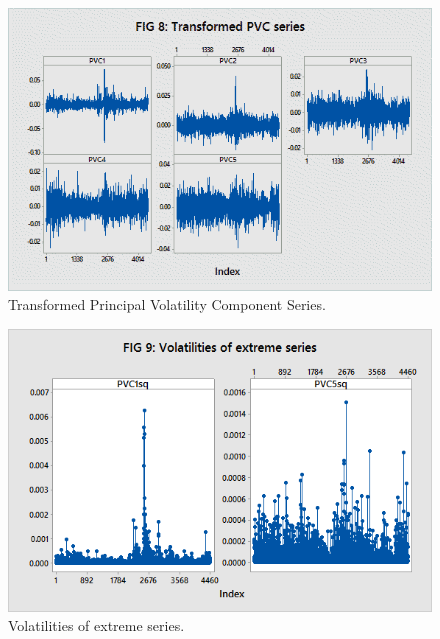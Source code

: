 	\begin{figure}[H]
	\centering
	\includegraphics[width=\textwidth]{chapters/chapter_mvts/figures/transpvc.png}
	\caption{Transformed Principal Volatility Component Series. \label{fig:transpvc}}
	\end{figure}


	\begin{figure}[H]
	\centering
	\includegraphics[width=\textwidth]{chapters/chapter_mvts/figures/volextreme.png}
	\caption{Volatilities of extreme series. \label{fig:volextreme}}
	\end{figure}


